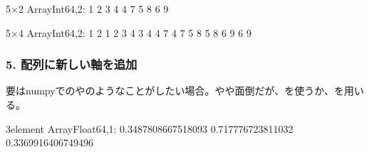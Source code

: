 \documentclass[letterpaper,10pt,english]{sphinxmanual}
\begin{document}
\begin{sphinxVerbatim}[commandchars=\\\{\}]
  \PYG{p}{[} \PYG{l+s+s1}{]}
\end{sphinxVerbatim}

\begin{sphinxVerbatim}[commandchars=\\\{\}]
5×2 Array\PYGZob{}Int64,2\PYGZcb{}:
 1  2
 3  4
 4  7
 5  8
 6  9
\end{sphinxVerbatim}

\begin{sphinxVerbatim}[commandchars=\\\{\}]
\PYG{p}{[} \PYG{p}{[}\PYG{l+s+s1}{]]}
\end{sphinxVerbatim}

\begin{sphinxVerbatim}[commandchars=\\\{\}]
5×4 Array\PYGZob{}Int64,2\PYGZcb{}:
 1  2  1  2
 3  4  3  4
 4  7  4  7
 5  8  5  8
 6  9  6  9
\end{sphinxVerbatim}


\subsubsection{5. 配列に新しい軸を追加}
\label{\detokenize{tips:id4}}
要はnumpyでのやのようなことがしたい場合。やや面倒だが、を使うか、\sphinxcode{\sphinxupquote{{[}CartesianIndex(){]}}}を用いる。

\begin{sphinxVerbatim}[commandchars=\\\{\}]
  
\end{sphinxVerbatim}

\begin{sphinxVerbatim}[commandchars=\\\{\}]
3\PYGZhy{}element Array\PYGZob{}Float64,1\PYGZcb{}:
 0.3487808667518093
 0.717776723811032
 0.3369916406749496
\end{sphinxVerbatim}

\begin{sphinxVerbatim}[commandchars=\\\{\}]
  \PYG{p}{[}\PYG{p}{]}
  \PYG{p}{[} \PYG{p}{]}
\end{sphinxVerbatim}
\end{document}
